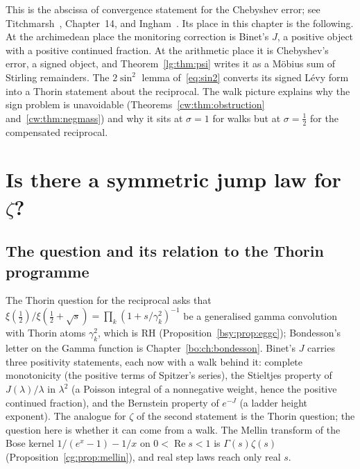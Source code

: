 This is the abscissa of convergence statement for the Chebyshev error; see Titchmarsh~\cite{Titchmarsh}, Chapter~14, and Ingham~\cite{Ingham32}. %
Its place in this chapter is the following. At the archimedean place the monitoring correction is Binet's $J$, a positive object with a positive continued fraction. At the arithmetic place it is Chebyshev's error, a signed object, and Theorem~\ref{lg:thm:psi} writes it as a M\"obius sum of Stirling remainders. The $2\sin^2$ lemma of~\eqref{eq:sin2} converts its signed L\'evy form into a Thorin statement about the reciprocal. The walk picture explains why the sign problem is unavoidable (Theorems~\ref{cw:thm:obstruction} and~\ref{cw:thm:negmass}) and why it sits at $\sigma=1$ for walks but at $\sigma=\frac12$ for the compensated reciprocal.

\section{Is there a symmetric jump law for $\zeta$?}\label{cw:sec:jump}

\subsection{The question and its relation to the Thorin programme}
The Thorin question for the reciprocal asks that $\xi(\frac12)/\xi(\frac12+\sqrt s)=\prod_k(1+s/\gamma_k^2)^{-1}$ be a generalised gamma convolution with Thorin atoms $\gamma_k^2$, which is RH (Proposition~\ref{bsy:prop:eggc}); Bondesson's letter on the Gamma function is Chapter~\ref{bo:ch:bondesson}. Binet's $J$ carries three positivity statements, each now with a walk behind it: complete monotonicity (the positive terms of Spitzer's series), the Stieltjes property of $J(\lambda)/\lambda$ in $\lambda^2$ (a Poisson integral of a nonnegative weight, hence the positive continued fraction), and the Bernstein property of $e^{-J}$ (a ladder height exponent). The analogue for $\zeta$ of the second statement is the Thorin question; the question here is whether it can come from a walk. The Mellin transform of the Bose kernel $1/(e^x-1)-1/x$ on $0<\operatorname{Re}s<1$ is $\Gamma(s)\zeta(s)$ (Proposition~\ref{cg:prop:mellin}), and real step laws reach only real $s$.

